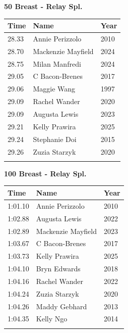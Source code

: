 \vspace{1.2em}
\noindent\begin{minipage}[t]{0.48\textwidth}
\centering
\textbf{\textcolor{teamprimary}{50 Breast - Relay Spl.}}\par
\vspace{0.5em}
\centering
\small
\renewcommand{\arraystretch}{1.0}
\setlength{\tabcolsep}{4pt}
\begin{tabular}{@{}p{1.8cm}p{3.0cm}p{1.0cm}@{}}
\toprule
\textbf{Time} & \textbf{Name} & \textbf{Year} \\
\midrule
28.33 & Annie Perizzolo & 2010 \\
28.70 & Mackenzie Mayfield & 2024 \\
28.75 & Milan Manfredi & 2024 \\
29.05 & C Bacon-Brenes & 2017 \\
29.06 & Maggie Wang & 1997 \\
29.09 & Rachel Wander & 2020 \\
29.09 & Augusta Lewis & 2023 \\
29.21 & Kelly Prawira & 2025 \\
29.24 & Stephanie Doi & 2015 \\
29.26 & Zuzia Starzyk & 2020 \\
\bottomrule
\vspace{0.5em}
\end{tabular}
\end{minipage}
\hfill
\begin{minipage}[t]{0.48\textwidth}
\centering
\textbf{\textcolor{teamprimary}{100 Breast - Relay Spl.}}\par
\vspace{0.5em}
\centering
\small
\renewcommand{\arraystretch}{1.0}
\setlength{\tabcolsep}{4pt}
\begin{tabular}{@{}p{1.8cm}p{3.0cm}p{1.0cm}@{}}
\toprule
\textbf{Time} & \textbf{Name} & \textbf{Year} \\
\midrule
1:01.10 & Annie Perizzolo & 2010 \\
1:02.88 & Augusta Lewis & 2022 \\
1:02.89 & Mackenzie Mayfield & 2023 \\
1:03.67 & C Bacon-Brenes & 2017 \\
1:03.73 & Kelly Prawira & 2025 \\
1:04.10 & Bryn Edwards & 2018 \\
1:04.16 & Rachel Wander & 2022 \\
1:04.24 & Zuzia Starzyk & 2020 \\
1:04.26 & Maddy Gebhard & 2013 \\
1:04.35 & Kelly Ngo & 2014 \\
\bottomrule
\vspace{0.5em}
\end{tabular}
\end{minipage}

